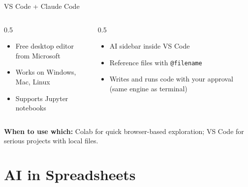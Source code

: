 \documentclass[aspectratio=169]{beamer}
\begin{document}
\begin{frame}{VS Code + Claude Code}
\begin{columns}[T]
\begin{column}{0.5\textwidth}
\begin{shadedbox}[title=\textbf{VS Code}]
\begin{itemize}\small
  \item Free desktop editor from Microsoft
  \item Works on Windows, Mac, Linux
  \item Supports Jupyter notebooks
\end{itemize}
\end{shadedbox}
\end{column}
\begin{column}{0.5\textwidth}
\begin{shadedbox}[title=\textbf{Claude Code Extension}]
\begin{itemize}\small
  \item AI sidebar inside VS Code
  \item Reference files with \texttt{@filename}
  \item Writes and runs code with your approval (same engine as terminal)
\end{itemize}
\end{shadedbox}
\end{column}
\end{columns}
\vspace{0.3cm}
\begin{center}
\textbf{When to use which:} Colab for quick browser-based exploration; VS Code for serious projects with local files.
\end{center}
\end{frame}

\section{AI in Spreadsheets}
\end{document}
